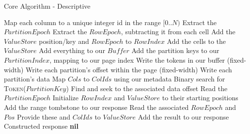 \documentclass[fleqn]{article}
\begin{document}
\begin{algorithm}
\scriptsize
\caption{Core Algorithm - Descriptive}
\begin{algorithmic}[1]
\State Map each column to a unique integer id in the range $[0..N)$
 \State Extract the $PartitionEpoch$
   \State Extract the $RowEpoch$, subtracting it from each cell
   \State Add the $ValueStore$ position/key and $RowEpoch$ to $RowIndex$
   \State Add the cells to the $ValueStore$
 \EndFor
 \State Add everything to our $Buffer$
   \State Add the partition keys to our $PartitionIndex$, mapping to our page index
   \State Write the tokens in our buffer (fixed-width)
   \State Write each partition's offset within the page (fixed-width)
   \State Write each partition's data
 \EndIf
\EndFor
\EndProcedure
\Statex
{}
\State Map $Cols$ to $ColIds$ using our metadata
 \State Binary search for \textsc{Token}($PartitionKey$)
  \State Find and seek to the associated data offset
   \State Read the $PartitionEpoch$
   \State Initialize $RowIndex$ and $ValueStore$ to their starting positions
      \State Add the range tombstone to our response
     \Else
      \State Read the associated $RowEpoch$ and $Pos$
      \State Provide these and $ColIds$ to $ValueStore$
      \State Add the result to our response
     \EndIf
   \EndFor
   \Return Constructed response
  \EndIf
 \EndFor
\EndFor
\Return \textbf{nil}
\EndFunction
\end{algorithmic}
\end{algorithm}
\end{document}
